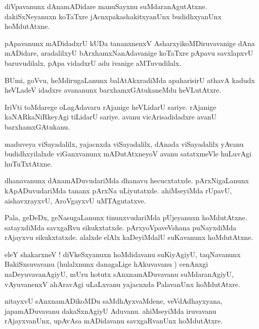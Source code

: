 \documentclass{article}
\begin{document}
\begin{mn}%
diVpavanunx dAnamADidare manuSayxnu suMdaranAgutAtxne. dakiSxNeyanuxn koTaTxre 
jAcnxpakashakitxyanUnx budidhxyanUnx hoMdutAtxne.
\end{mn}

\begin{mn}%
pApavanunx mADidadxrU kUDa tananxnenxV AsharxyikoMDiruvavanige dAna mADidare, aradalilxyU 
bArxhamxNanAdavanige koTaTxre pApavu savxlapxvU baruvudilalx. pApa vidadxrU adu ivanige 
aMTuvudilalx.
\end{mn}

\begin{mn}%
BUmi, goVvu, heMdirugaLanunx balAtAkxradiMda apaharisirU athavA kadudx heVLadeV idadxre avananunx 
barxhamxGAtukaneMdu heVLutAtxre.
\end{mn}

\begin{mn}%
IriVti toMdarege oLagAdavaru rAjanige heVLidarU sariye. rAjanige kaNARkaNiRkeyAgi tiLidarU sariye. 
avanu vicArisadidadxre avanU barxhamxGAtukanu.
\end{mn}

\begin{mn}%
maduveya viSayadalilx, yajacnxda viSayadalilx, dAnada viSayadalilx yAvanu budidhxyilalxde 
viGanxvanunx mADutAtxneyoV avanu satatxmeVle huLuvAgi huTuTxtAtxne.
\end{mn}

\begin{mn}%
dhanavanunx dAnamADuvudariMda dhanavu hecucxtatxde. pArxNigaLanunx kApADuvudariMda tananx pArxNa 
uLiyutatxde. ahiMseyiMda rUpavU, aishavxrayxvU, AroVgayxvU uMTAgutatxve.
\end{mn}

\begin{mn}%
Pala, geDeDx, geNasugaLanunx tinunxvudariMda pUjeyanuxn hoMdutAtxne. satayxdiMda savxgaRvu 
sikukxtatxde. pArxyoVpaveVshana puNayxdiMda rAjayxvu sikukxtatxde. alalxde elAlx kaDeyiMdalU 
suKavanunx hoMdutAtxne.
\end{mn}

\begin{mn}%
eleY shakarxneV ! diVkeSxyanuxn hoMdidavanu suKiyAgiyU, taqNavanunx BakiSxsuvavanu (hulalxnunx 
danagaLige hAkuvavanu ) cenAnxgi naDeyuvavanAgiyU, mUru hotutx sAnxnamADuvavanu suMdaranAgiyU, 
vAyuvanenxV ahAravAgi uLaLxvanu yajacnxda PalavanUnx hoMdutAtxre.
\end{mn}

\begin{mn}%
nitayxvU sAnxnamADikoMDu saMdhAyxvaMdene, veVdAdhayxyana, japamADuvavanu dakaSxnAgiyU Aduvanu. 
ahiMseyiMda iruvavanu rAjayxvanUnx, upAvAsa mADidavanu savxgaRvanUnx hoMdutAtxre.
\end{mn}
\end{document}
